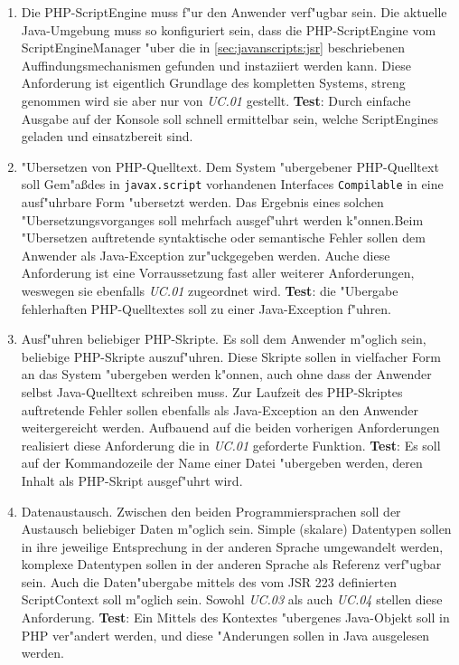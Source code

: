\begin{enumerate}
\item Die PHP-ScriptEngine muss f"ur den Anwender verf"ugbar sein. Die aktuelle Java-Umgebung muss so konfiguriert sein,
    dass die PHP-ScriptEngine vom ScriptEngineManager "uber die in \ref{sec:javanscripts:jsr} beschriebenen Auffindungsmechanismen
    gefunden und instaziiert werden kann. Diese Anforderung ist eigentlich Grundlage des kompletten Systems, streng genommen wird sie
    aber nur von \emph{UC.01} gestellt.
    \textbf{Test}: Durch einfache Ausgabe auf der Konsole soll schnell ermittelbar sein, welche ScriptEngines geladen und einsatzbereit sind.

\item "Ubersetzen von PHP-Quelltext. Dem System "ubergebener PHP-Quelltext soll Gem"a\ss des in \texttt{javax.script} vorhandenen 
    Interfaces \texttt{Compilable} in eine ausf"uhrbare Form "ubersetzt werden. Das Ergebnis eines solchen "Ubersetzungsvorganges
    soll mehrfach ausgef"uhrt werden k"onnen.Beim "Ubersetzen auftretende syntaktische oder semantische Fehler sollen dem Anwender 
    als Java-Exception zur"uckgegeben werden.
    Auche diese Anforderung ist eine Vorraussetzung fast aller weiterer Anforderungen, weswegen sie ebenfalls \emph{UC.01} zugeordnet wird.
    \textbf{Test}: die "Ubergabe fehlerhaften PHP-Quelltextes soll zu einer Java-Exception f"uhren.

\item Ausf"uhren beliebiger PHP-Skripte. Es soll dem Anwender m"oglich sein, beliebige PHP-Skripte auszuf"uhren. Diese Skripte sollen
    in vielfacher Form an das System "ubergeben werden k"onnen, auch ohne dass der Anwender selbst Java-Quelltext schreiben muss.
    Zur Laufzeit des PHP-Skriptes auftretende Fehler sollen ebenfalls als Java-Exception an den Anwender weitergereicht werden.
    Aufbauend auf die beiden vorherigen Anforderungen realisiert diese Anforderung die in \emph{UC.01} geforderte Funktion.
    \textbf{Test}: Es soll auf der Kommandozeile der Name einer Datei "ubergeben werden, deren Inhalt als PHP-Skript ausgef"uhrt wird.

\item Datenaustausch. Zwischen den beiden Programmiersprachen soll der Austausch beliebiger Daten m"oglich sein. Simple (skalare)
    Datentypen sollen in ihre jeweilige Entsprechung in der anderen Sprache umgewandelt werden, komplexe Datentypen sollen in der anderen 
    Sprache als Referenz verf"ugbar sein. Auch die Daten"ubergabe mittels des vom JSR 223 definierten ScriptContext soll m"oglich sein.
    Sowohl \emph{UC.03} als auch \emph{UC.04} stellen diese Anforderung. 
    \textbf{Test}: Ein Mittels des Kontextes "ubergenes Java-Objekt soll in PHP ver"andert werden, und diese "Anderungen sollen in
    Java ausgelesen werden.


\end{enumerate}
